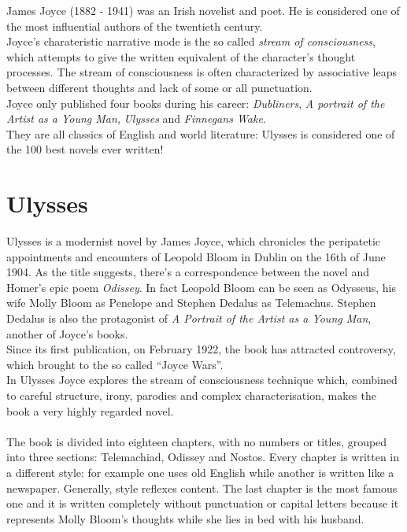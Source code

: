 \documentclass[10pt]{report}
\begin{document}
		James Joyce (1882 - 1941) was an Irish novelist and poet. He is considered one of the most influential authors of the twentieth century.\\
		Joyce's charateristic narrative mode is the so called \textit{stream of consciousness}, which attempts to give the written equivalent of the character's thought processes. The stream of consciousness is often characterized by associative leaps between different thoughts and lack of some or all punctuation. \\
		Joyce only published four books during his career: \textit{Dubliners}, \textit{A portrait of the Artist as a Young Man}, \textit{Ulysses} and \textit{Finnegans Wake}.\\
		They are all classics of English and world literature: Ulysses is considered one of the 100 best novels ever written!
		\section{Ulysses}
			Ulysses is a modernist novel by James Joyce, which chronicles the peripatetic appointments and encounters of Leopold Bloom in Dublin on the 16th of June 1904. As the title suggests, there's a correspondence between the novel and Homer's epic poem \textit{Odissey}. In fact Leopold Bloom can be seen as Odysseus, his wife Molly Bloom as Penelope and Stephen Dedalus as Telemachus. Stephen Dedalus is also the protagonist of \textit{A Portrait of the Artist as a Young Man}, another of Joyce's books.\\
			Since its first publication, on February 1922, the book has attracted controversy, which brought to the so called ``Joyce Wars''.\\
			In Ulysses Joyce explores the stream of consciousness technique which, combined to careful structure, irony, parodies and complex characterisation, makes the book a very highly regarded novel.\\\\
			The book is divided into eighteen chapters, with no numbers or titles, grouped into three sections: Telemachiad, Odissey and Nostos. Every chapter is written in a different style: for example one uses old English while another is written like a newspaper. Generally, style reflexes content. The last chapter is the most famous one and it is written completely without punctuation or capital letters because it represents Molly Bloom's thoughts while she lies in bed with his husband. \\
\end{document}
